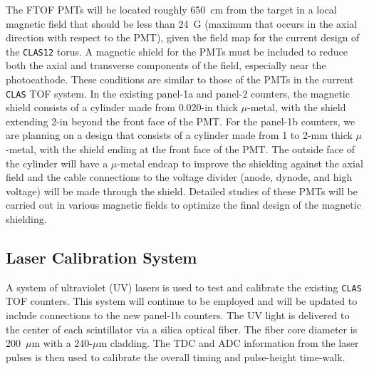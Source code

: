 The FTOF PMTs will be located roughly 650~cm from the target in a local
magnetic field that should be less than 24~G (maximum that occurs in
the axial direction with respect to the PMT), given the field map for the 
current design of the {\tt CLAS12} torus.  A magnetic shield for the PMTs 
must be included to reduce both the axial and transverse components of the 
field, especially near the photocathode.  These conditions are similar to 
those of the PMTs in the current {\tt CLAS} TOF system.  In the existing 
panel-1a and panel-2 counters, the magnetic shield consists of a cylinder 
made from 0.020-in thick $\mu$-metal, with the shield extending 2-in beyond 
the front face of the PMT.  For the panel-1b counters, we are planning on a 
design that consists of a cylinder made from 1 to 2-mm thick $\mu$-metal, 
with the shield ending at the front face of the PMT.  The outside face of 
the cylinder will have a $\mu$-metal endcap to improve the shielding
against the axial field and the cable connections to the voltage divider
(anode, dynode, and high voltage) will be made through the shield.  Detailed 
studies of these PMTs will be carried out in various magnetic fields to 
optimize the final design of the magnetic shielding.

\subsection{Laser Calibration System} 
\label{sec:laser}

A system of ultraviolet (UV) lasers is used to test and calibrate the 
existing {\tt CLAS} TOF counters.  This system will continue to be employed
and will be updated to include connections to the new panel-1b counters. 
The UV light is delivered to the center of each scintillator via a silica 
optical fiber.  The fiber core diameter is 200~$\mu$m with a 240-$\mu$m 
cladding.  The TDC and ADC information from the laser pulses is then used
to calibrate the overall timing and pulse-height time-walk. 

